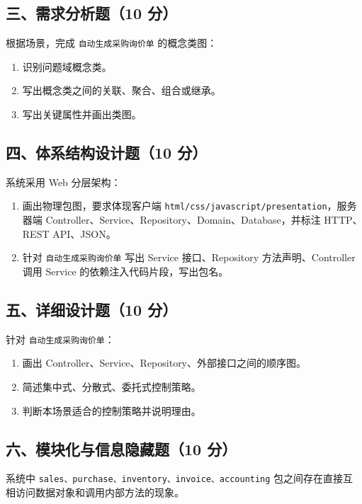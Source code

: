 \documentclass[UTF8,zihao=-4]{ctexart}
\begin{document}
\subsection{三、需求分析题（10 分）}


根据场景，完成 \texttt{自动生成采购询价单} 的概念类图：


\begin{enumerate}
\item 识别问题域概念类。
\item 写出概念类之间的关联、聚合、组合或继承。
\item 写出关键属性并画出类图。
\end{enumerate}


\subsection{四、体系结构设计题（10 分）}


系统采用 Web 分层架构：


\begin{enumerate}
\item 画出物理包图，要求体现客户端 \texttt{html/css/javascript/presentation}，服务器端 Controller、Service、Repository、Domain、Database，并标注 HTTP、REST API、JSON。
\item 针对 \texttt{自动生成采购询价单} 写出 Service 接口、Repository 方法声明、Controller 调用 Service 的依赖注入代码片段，写出包名。
\end{enumerate}


\subsection{五、详细设计题（10 分）}


针对 \texttt{自动生成采购询价单}：


\begin{enumerate}
\item 画出 Controller、Service、Repository、外部接口之间的顺序图。
\item 简述集中式、分散式、委托式控制策略。
\item 判断本场景适合的控制策略并说明理由。
\end{enumerate}


\subsection{六、模块化与信息隐藏题（10 分）}


系统中 \texttt{sales、purchase、inventory、invoice、accounting} 包之间存在直接互相访问数据对象和调用内部方法的现象。
\end{document}
